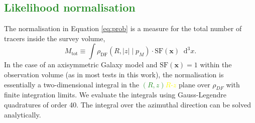 \documentclass[iop,revtex4,numberedappendix,appendixfloats]{emulateapj}
\newcommand{\vect}[1]{\boldsymbol{#1}}
\newcommand*\Diff[1]{\mathop{}\!\mathrm{d^#1}}
\newcommand{\pmodel}{\ensuremath{p_M}}
\newcommand{\NEW}[1]{\textcolor{ForestGreen}{#1}}
\newcommand{\OLD}[1]{\textcolor{Yellow}{#1}}%
\begin{document}
\subsection{\NEW{Likelihood normalisation}} \label{sec:likelihood_normalisation}

The normalisation in Equation \eqref{eq:prob} is a measure for the total number of tracers inside the survey volume,
\begin{equation}
M_\text{tot} \equiv \int  \rho_\text{DF}(R,|z| \mid \pmodel) \cdot \text{SF}(\vect{x}) \Diff 3 x.\label{eq:normalisation}
\end{equation}
In the case of an axisymmetric Galaxy model and $\text{SF}(\vect{x})=1$ within the observation volume (as in most tests in this work), the normalisation is essentially a two-dimensional integral in the \NEW{$(R,z)$}\OLD{$R$-$z$} plane over $\rho_{DF}$ with finite integration limits. We evaluate the integrals using Gauss-Legendre quadratures of order 40. The integral over the azimuthal direction can be solved analytically. 
\end{document}
